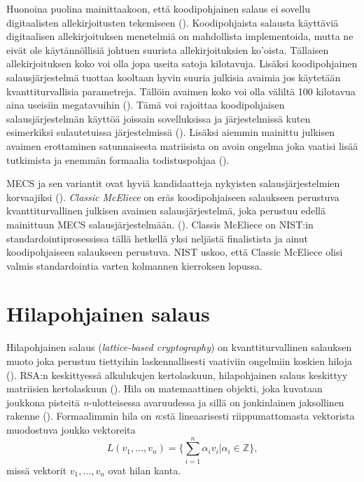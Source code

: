 Huonoina puolina mainittaakoon, että koodipohjainen salaus ei sovellu digitaalisten allekirjoitusten tekemiseen (\cite{8012331}). Koodipohjaista salausta käyttäviä digitaalisen allekirjoituksen menetelmiä on mahdollista implementoida, mutta ne eivät ole käytännöllisiä johtuen suurista allekirjoituksien ko'oista. Tällaisen allekirjoituksen koko voi olla jopa useita satoja kilotavuja. Lisäksi koodipohjainen salausjärjestelmä tuottaa kooltaan hyvin suuria julkisia avaimia jos käytetään kvanttiturvallisia parametreja. Tällöin avaimen koko voi olla väliltä 100 kilotavua aina useisiin megatavuihin (\cite{mavroeidis2018impact}). Tämä voi rajoittaa koodipohjaisen salausjärjestelmän käyttöä joissain sovelluksissa ja järjestelmissä kuten esimerkiksi sulautetuissa järjestelmissä (\cite{repka2014overview}). Lisäksi aiemmin mainittu julkisen avaimen erottaminen satunnaisesta matriisista on avoin ongelma joka vaatisi lisää tutkimista ja enemmän formaalia todistuspohjaa (\cite{8012331}).

MECS ja sen variantit ovat hyviä kandidaatteja nykyisten salausjärjestelmien korvaajiksi (\cite{8012331}). \emph{Classic McEliece} on eräs koodipohjaiseen salaukseen perustuva kvanttiturvallinen julkisen avaimen salausjärjestelmä, joka perustuu edellä mainittuun MECS salausjärjestelmään. (\cite{alagic2020status}). Classis McEliece on NIST:in standardointiprosessissa tällä hetkellä yksi neljästä finalistista ja ainut koodipohjaiseen salaukseen perustuva. NIST uskoo, että Classic McEliece olisi valmis standardointia varten kolmannen kierroksen lopussa.

\section{Hilapohjainen salaus}
Hilapohjainen salaus (\emph{lattice-based cryptography}) on kvanttiturvallinen salauksen muoto joka perustuu tiettyihin laskennallisesti vaativiin ongelmiin koskien hiloja (\cite{regev2006lattice}). RSA:n keskittyessä alkulukujen kertolaskuun, hilapohjainen salaus keskittyy matriisien kertolaskuun (\cite{mavroeidis2018impact}). Hila on matemaattinen objekti, joka kuvataan joukkona pisteitä \emph{n}-ulotteisessa avaruudessa ja sillä on jonkinlainen jaksollinen rakenne (\cite{regev2006lattice}). Formaalimmin hila on \emph{n}:stä lineaarisesti riippumattomasta vektorista muodostuva joukko vektoreita 
\[L(v_1, \ldots ,v_n) =\Bigg\{ {\sum_{i=1}^{n}\alpha_i 
v_i|\alpha_i \in \mathbb{Z}} \Bigg\},\]
missä vektorit $v_1, \ldots ,v_n$ ovat hilan kanta.

